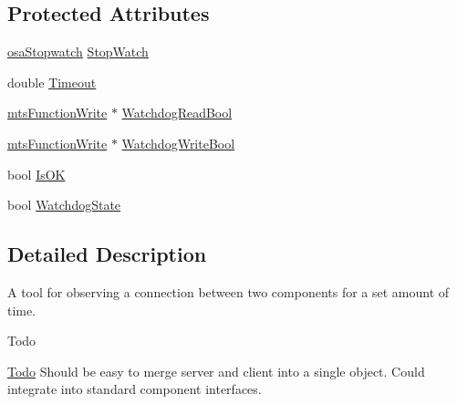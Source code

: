 \subsection*{Protected Attributes}
\begin{DoxyCompactItemize}
\item 
\hyperlink{classosa_stopwatch}{osa\-Stopwatch} \hyperlink{classmts_watchdog_server_a4146034e7300b9b8e57cc9afe0898a06}{Stop\-Watch}
\item 
double \hyperlink{classmts_watchdog_server_a57831b2480ac7446f722a4f3ae1b3b29}{Timeout}
\item 
\hyperlink{classmts_function_write}{mts\-Function\-Write} $\ast$ \hyperlink{classmts_watchdog_server_a76cde78867629a99328c62a05ff3e89f}{Watchdog\-Read\-Bool}
\item 
\hyperlink{classmts_function_write}{mts\-Function\-Write} $\ast$ \hyperlink{classmts_watchdog_server_a89fd0c0ada0929c6804b03a39971a2e3}{Watchdog\-Write\-Bool}
\item 
bool \hyperlink{classmts_watchdog_server_aec30e3bb25866ace005d3f05bc847614}{Is\-O\-K}
\item 
bool \hyperlink{classmts_watchdog_server_add9a62bd26805a1fe77314242d91efd6}{Watchdog\-State}
\end{DoxyCompactItemize}


\subsection{Detailed Description}
A tool for observing a connection between two components for a set amount of time. \begin{DoxyRefDesc}{Todo}
\item[\hyperlink{todo__todo000010}{Todo}]Should be easy to merge server and client into a single object. Could integrate into standard component interfaces. \end{DoxyRefDesc}


